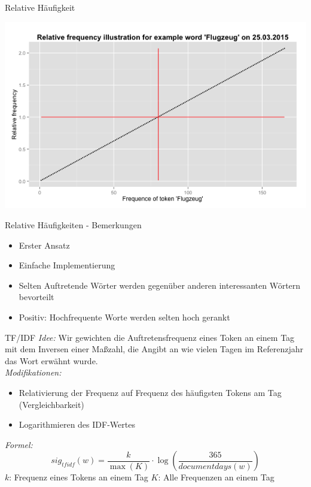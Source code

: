 \documentclass{beamer}
\begin{document}
\begin{frame}{Relative Häufigkeit}
	  \begin{centering}
	  \includegraphics[width=1\textwidth]{pictures/relfreqFlugzeug.png}
	\end{centering}
\end{frame}

\begin{frame}{Relative H\"aufigkeiten - Bemerkungen}
\begin{itemize}
 	\item Erster Ansatz
 	\item Einfache Implementierung
 	\item Selten Auftretende W\"orter werden gegen\"uber anderen interessanten W\"ortern bevorteilt
	\item{Positiv: Hochfrequente Worte werden selten hoch gerankt}
 \end{itemize}
\end{frame}


\begin{frame}{TF/IDF}
 	\emph{Idee: } Wir gewichten die Auftretensfrequenz eines Token an einem Tag mit dem Inversen einer Maßzahl, die Angibt an wie vielen Tagen im Referenzjahr das Wort erw\"ahnt wurde.\\
	\emph{Modifikationen: } 
	\begin{itemize}
		\item{Relativierung der Frequenz auf Frequenz des h\"aufigsten Tokens am Tag (Vergleichbarkeit)}
		\item{Logarithmieren des IDF-Wertes}
	\end{itemize}
	\emph{Formel:}
	 \begin{equation}
		sig_{tf idf}(w) = \frac{k}{\max(K)} \cdot \log ( \frac{365}{documentdays(w)})
	\end{equation}
	$k$: Frequenz eines Tokens an einem Tag
	$K$: Alle Frequenzen an einem Tag
\end{frame}
\end{document}
